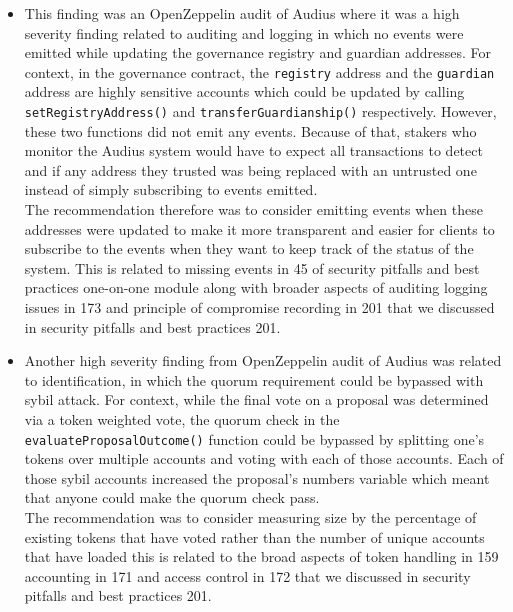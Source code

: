 \begin{itemize}
\item
  This finding was an OpenZeppelin audit of Audius where it was a high
  severity finding related to auditing and logging in which no events
  were emitted while updating the governance registry and guardian
  addresses. For context, in the governance contract, the
  \texttt{registry} address and the \texttt{guardian} address are highly
  sensitive accounts which could be updated by calling
  \texttt{setRegistryAddress()} and \texttt{transferGuardianship()}
  respectively. However, these two functions did not emit any events.
  Because of that, stakers who monitor the Audius system would have to
  expect all transactions to detect and if any address they trusted was
  being replaced with an untrusted one instead of simply subscribing to
  events emitted.\\

  The recommendation therefore was to consider emitting events when
  these addresses were updated to make it more transparent and easier
  for clients to subscribe to the events when they want to keep track of
  the status of the system. This is related to missing events in 45 of
  security pitfalls and best practices one-on-one module along with
  broader aspects of auditing logging issues in 173 and principle of
  compromise recording in 201 that we discussed in security pitfalls and
  best practices 201.
\item
  Another high severity finding from OpenZeppelin audit of Audius was
  related to identification, in which the quorum requirement could be
  bypassed with sybil attack. For context, while the final vote on a
  proposal was determined via a token weighted vote, the quorum check in
  the \texttt{evaluateProposalOutcome()} function could be bypassed by
  splitting one's tokens over multiple accounts and voting with each of
  those accounts. Each of those sybil accounts increased the proposal's
  numbers variable which meant that anyone could make the quorum check
  pass.\\

  The recommendation was to consider measuring size by the percentage of
  existing tokens that have voted rather than the number of unique
  accounts that have loaded this is related to the broad aspects of
  token handling in 159 accounting in 171 and access control in 172 that
  we discussed in security pitfalls and best practices 201.
\end{itemize}

